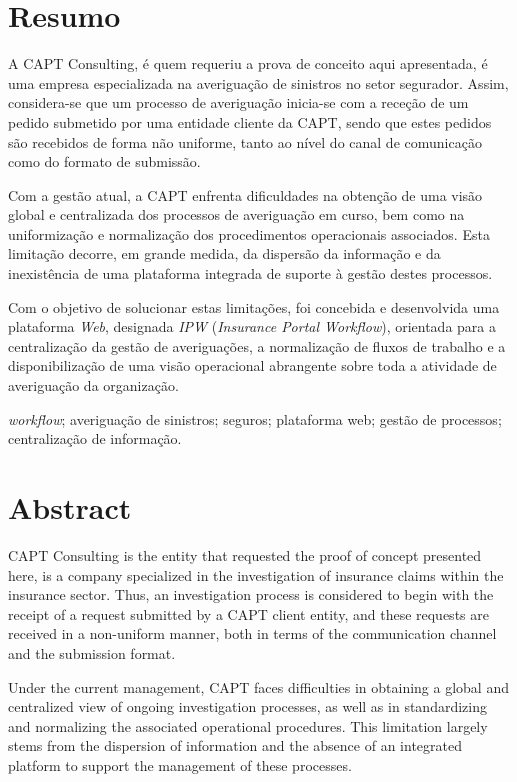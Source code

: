\documentclass[a4paper,openright,twoside,11pt]{report}
\begin{document}
\cleardoublepage
\chapter*{Resumo}
\noindent
A CAPT Consulting, é quem requeriu a prova de conceito aqui apresentada, é uma empresa especializada na averiguação de sinistros no setor segurador. Assim, considera-se que um processo de averiguação inicia-se com a receção de um pedido submetido por uma entidade cliente da CAPT, sendo que estes pedidos são recebidos de forma não uniforme, tanto ao nível do canal de comunicação como do formato de submissão.

Com a gestão atual, a CAPT enfrenta dificuldades na obtenção de uma visão global e centralizada dos processos de averiguação em curso, bem como na uniformização e normalização dos procedimentos operacionais associados. Esta limitação decorre, em grande medida, da dispersão da informação e da inexistência de uma plataforma integrada de suporte à gestão destes processos.

Com o objetivo de solucionar estas limitações, foi concebida e desenvolvida uma plataforma \textit{Web}, designada \textit{IPW} (\textit{Insurance Portal Workflow}), orientada para a centralização da gestão de averiguações, a normalização de fluxos de trabalho e a disponibilização de uma visão operacional abrangente sobre toda a atividade de averiguação da organização.

\bigskip
{} \textit{workflow}; averiguação de sinistros; seguros; plataforma web; gestão de processos; centralização de informação.


\cleardoublepage
\chapter*{Abstract}
\noindent
CAPT Consulting is the entity that requested the proof of concept presented here, is a company specialized in the investigation of insurance claims within the insurance sector. Thus, an investigation process is considered to begin with the receipt of a request submitted by a CAPT client entity, and these requests are received in a non-uniform manner, both in terms of the communication channel and the submission format.

Under the current management, CAPT faces difficulties in obtaining a global and centralized view of ongoing investigation processes, as well as in standardizing and normalizing the associated operational procedures. This limitation largely stems from the dispersion of information and the absence of an integrated platform to support the management of these processes.
\end{document}
